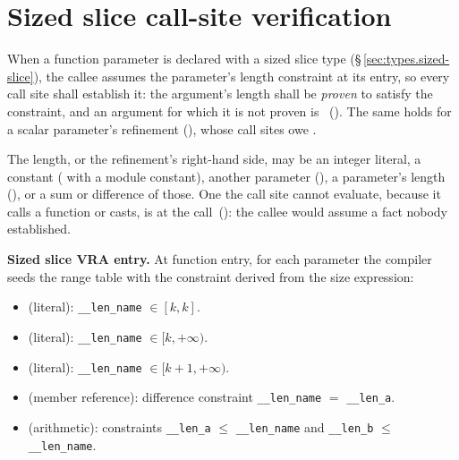 \section{Sized slice call-site verification}
\label{sec:vra.sized-slice-callsite}

\pnum
When a function parameter is declared with a sized slice type
(\S\,\ref{sec:types.sized-slice}), the callee assumes the parameter's length constraint at its
entry, so every call site shall establish it: the argument's length shall be \emph{proven} to
satisfy the constraint, and an argument for which it is not proven is
\illformed{}~(). The same holds for a scalar parameter's refinement
(), whose call sites owe .

\pnum
The length, or the refinement's right-hand side, may be an integer literal, a constant
( with  a module constant), another parameter (), a parameter's
length (), or a sum or difference of those. One the call site cannot evaluate,
because it calls a function or casts, is \illformed{} at the call~(): the callee
would assume a fact nobody established.

\begin{example}
\end{example}

\pnum
\textbf{Sized slice VRA entry.}
At function entry, for each parameter  the compiler
seeds the range table with the constraint derived from the size
expression:

\begin{itemize}
  \item {} (literal): \texttt{\_\_len\_name} $\in [k, k]$.
  \item {} (literal): \texttt{\_\_len\_name} $\in [k, +\infty)$.
  \item {} (literal): \texttt{\_\_len\_name} $\in [k{+}1, +\infty)$.
  \item {} (member reference): difference constraint
        \texttt{\_\_len\_name} $=$ \texttt{\_\_len\_a}.
  \item {} (arithmetic): constraints
        \texttt{\_\_len\_a} $\leq$ \texttt{\_\_len\_name} and
        \texttt{\_\_len\_b} $\leq$ \texttt{\_\_len\_name}.
\end{itemize}

